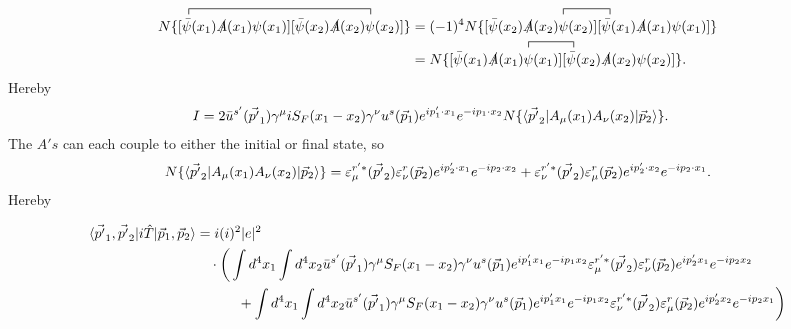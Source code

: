 \begin{example}
	\begin{equation}
		\begin{split}
			\contraction{,,,,}{\vec{p'}}{,,,,,,,,,,,,,,,,,,,,,,,,,\vec{k'}|}{\bar{\psi}}
			\contraction{.,,,,,,,,.,,,,,,,,,,,,,,,,,,,,,,,,,,,,,,,,,,,,,,,,,,,,,,,,,,,,,,,}{\vec{p'}}{,..,\vec{k'}|}{\bar{\psi}}
			N\{[\bar{\psi}(x_1)\slashed A(x_1)\psi(x_1)][\bar{\psi}(x_2)\slashed A(x_2)\psi(x_2)]\}&=(-1)^4N\{[\bar{\psi}(x_2)\slashed A(x_2)\psi(x_2)][\bar{\psi}(x_1)\slashed A(x_1)\psi(x_1)]\}\\
			&\contraction{,,,,,,,,,,,,,,,,,,}{\vec{p'}}{,,,\vec{k'}|}{\bar{\psi}}
			=N\{[\bar{\psi}(x_1)\slashed A(x_1)\psi(x_1)][\bar{\psi}(x_2)\slashed A(x_2)\psi(x_2)]\}.
		\end{split}
	\end{equation} 	
	Hereby
	\begin{equation}
		\begin{split}
			I&=2\bar{u}^{s'}(\vec{p'}_1)\gamma^\mu iS_{F}(x_1-x_2)\gamma^\nu u^s(\vec{p}_1)e^{ip'_1\cdot x_1}e^{-ip_1\cdot x_2}N\{\braket{\vec{p'}_2|A_\mu(x_1)A_\nu(x_2)|\vec{p}_2}\}.
		\end{split}
	\end{equation} 
	The $A's$ can each couple to either the initial or final state, so
	\begin{equation}
		\begin{split}
			N\{\braket{\vec{p'}_2|A_\mu(x_1)A_\nu(x_2)|\vec{p}_2}\}=\varepsilon_\mu^{r'*}(\vec{p'}_2)\varepsilon_\nu^{r}(\vec{p}_2)e^{ip'_2\cdot x_1}e^{-ip_2\cdot x_2}+\varepsilon_\nu^{r'*}(\vec{p'}_2)\varepsilon_\mu^{r}(\vec{p}_2)e^{ip'_2\cdot x_2}e^{-ip_2\cdot x_1}.
		\end{split}
	\end{equation} 
	Hereby
	\begin{footnotesize}
	 \begin{equation}
		\begin{split}
			\braket{\vec{p'}_1,\vec{p'}_2|i\hat{T}|\vec{p}_1, \vec{p}_2}&=i(i)^2|e|^2\\
			&\quad \cdot\bigg(\int d^4x_1\int d^4x_2
			\bar{u}^{s'}(\vec{p'}_1)\gamma^\mu S_{F}(x_1-x_2)\gamma^\nu u^s(\vec{p}_1)e^{ip'_1 x_1}e^{-ip_1 x_2}\varepsilon_\mu^{r'*}(\vec{p'}_2)\varepsilon_\nu^{r}(\vec{p}_2)e^{ip'_2 x_1}e^{-ip_2 x_2}\\
			&\quad\quad\quad+\int d^4x_1\int d^4x_2
			\bar{u}^{s'}(\vec{p'}_1)\gamma^\mu S_{F}(x_1-x_2)\gamma^\nu u^s(\vec{p}_1)e^{ip'_1 x_1}e^{-ip_1x_2}
			\varepsilon_\nu^{r'*}(\vec{p'}_2)\varepsilon_\mu^{r}(\vec{p}_2)e^{ip'_2x_2}e^{-ip_2 x_1}\bigg)\\

\end{split}
\end{equation}
\end{footnotesize}
\end{example}
